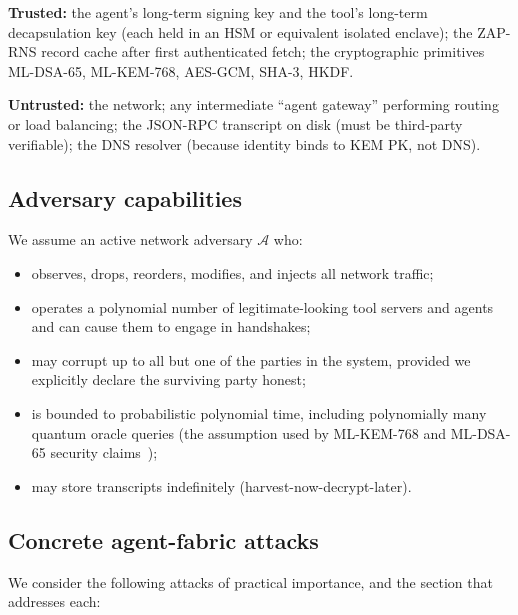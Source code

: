 \documentclass[11pt,a4paper]{article}
\theoremstyle{definition}
\theoremstyle{remark}
\newcommand{\rns}{\textsf{ZAP-RNS}\xspace}
\begin{document}
\textbf{Trusted:} the agent's long-term signing key and the tool's
long-term decapsulation key (each held in an HSM or equivalent
isolated enclave); the \rns{} record cache after first authenticated
fetch; the cryptographic primitives ML-DSA-65, ML-KEM-768, AES-GCM,
SHA-3, HKDF.

\textbf{Untrusted:} the network; any intermediate ``agent gateway''
performing routing or load balancing; the JSON-RPC transcript on disk
(must be third-party verifiable); the DNS resolver (because identity
binds to KEM PK, not DNS).

\subsection{Adversary capabilities}

We assume an active network adversary $\mathcal{A}$ who:
\begin{itemize}[leftmargin=2em,itemsep=0.25em]
\item observes, drops, reorders, modifies, and injects all
network traffic;
\item operates a polynomial number of legitimate-looking tool servers
and agents and can cause them to engage in handshakes;
\item may corrupt up to all but one of the parties in the system,
provided we explicitly declare the surviving party honest;
\item is bounded to probabilistic polynomial time, including
polynomially many quantum oracle queries (the assumption used by
ML-KEM-768 and ML-DSA-65 security claims~\cite{nistmlkem,nistmldsa});
\item may store transcripts indefinitely (harvest-now-decrypt-later).
\end{itemize}

\subsection{Concrete agent-fabric attacks}

We consider the following attacks of practical importance, and the
section that addresses each:
\end{document}
